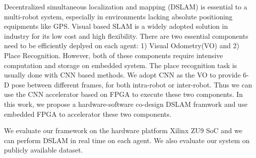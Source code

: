 Decentralized simultaneous localization and mapping (DSLAM) is essential to a multi-robot system, especially in environments lacking absolute positioning equipments like GPS.
Visual based SLAM is a widely adopted solution in industry for its low cost and high flexibility.
There are two essential components need to be efficiently deplyed on each agent: 1) Visual Odometry(VO) and 2) Place Recognition. However, both of these components require intensive computation and storage on embedded system.
The place recognition task is usually done with CNN based methods. We adopt CNN as the VO to provide 6-D pose between different frames, for both intra-robot or inter-robot. Thus we can use the CNN accelerator based on FPGA to execute these two components.
In this work, we propose a hardware-software co-design DSLAM framwork and use embedded FPGA to accelerator these two components.

We evaluate our framework on the hardware platform Xilinx ZU9 SoC and we can perform DSLAM in real time on each agent. We also evaluate our system on publicly  available dataset.